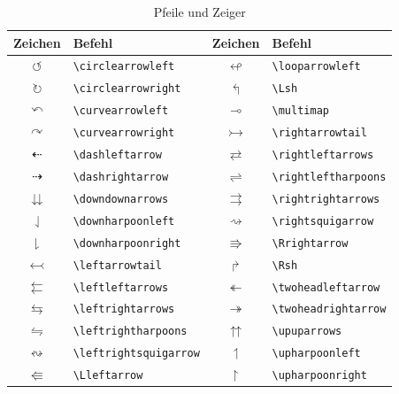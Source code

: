 \documentclass[a4paper,10pt,twoside]{scrbook}
\begin{document}
\begin{table}[h!tb]
\centering
\caption{Pfeile und Zeiger}
\label{Tabelle_Pfeile2}       %
\begin{tabular}{clcl}
\hline
Zeichen & Befehl & Zeichen & Befehl  \\
\hline
$\circlearrowleft$ & \texttt{\textbackslash circlearrowleft} & 
$\looparrowleft$ & \texttt{\textbackslash looparrowleft} \\
$\circlearrowright$ & \texttt{\textbackslash circlearrowright} &
$\Lsh$ & \texttt{\textbackslash Lsh} \\
$\curvearrowleft$ & \texttt{\textbackslash curvearrowleft} &
$\multimap$ & \texttt{\textbackslash multimap} \\
$\curvearrowright$ & \texttt{\textbackslash curvearrowright} &
$\rightarrowtail$ & \texttt{\textbackslash rightarrowtail} \\
$\dashleftarrow$ & \texttt{\textbackslash dashleftarrow} &
$\rightleftarrows$ & \texttt{\textbackslash rightleftarrows} \\
$\dashrightarrow$ & \texttt{\textbackslash dashrightarrow} &
$\rightleftharpoons$ & \texttt{\textbackslash rightleftharpoons} \\
$\downdownarrows$ & \texttt{\textbackslash downdownarrows} &
$\rightrightarrows$ & \texttt{\textbackslash rightrightarrows} \\
$\downharpoonleft$ & \texttt{\textbackslash downharpoonleft} &
$\rightsquigarrow$ & \texttt{\textbackslash rightsquigarrow} \\
$\downharpoonright$ & \texttt{\textbackslash downharpoonright} &
$\Rrightarrow$ & \texttt{\textbackslash Rrightarrow} \\
$\leftarrowtail$ & \texttt{\textbackslash leftarrowtail} &
$\Rsh$ & \texttt{\textbackslash Rsh} \\
$\leftleftarrows$ & \texttt{\textbackslash leftleftarrows} &
$\twoheadleftarrow$ & \texttt{\textbackslash twoheadleftarrow} \\
$\leftrightarrows$ & \texttt{\textbackslash leftrightarrows} &
$\twoheadrightarrow$ & \texttt{\textbackslash twoheadrightarrow} \\
$\leftrightharpoons$ & \texttt{\textbackslash leftrightharpoons} &
$\upuparrows$ & \texttt{\textbackslash upuparrows} \\
$\leftrightsquigarrow$ & \texttt{\textbackslash leftrightsquigarrow} &
$\upharpoonleft$ & \texttt{\textbackslash upharpoonleft} \\
$\Lleftarrow$ & \texttt{\textbackslash Lleftarrow} &
$\upharpoonright$ & \texttt{\textbackslash upharpoonright} \\
\hline
\end{tabular}
\end{table}
\end{document}
